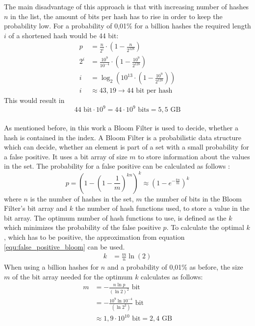 The main disadvantage of this approach is that with increasing number of hashes $n$ in the list, the amount of bits per hash has to rise in order to keep the probability low.
For a probability of 0,01\% for a billion hashes the required length $i$ of a shortened hash would be 44 bit:
\begin{equation}
	\begin{split}
		p&=\frac{n}{2^i}\cdot \left(1- \frac{n}{2^{128}}\right) \\[10pt]
		2^i&=\frac{10^9}{10^{-4}}\cdot \left(1- \frac{10^9}{2^{128}}\right) \\[10pt]
		i&=\log_2\left(10^{13}\cdot \left(1- \frac{10^9}{2^{128}}\right)\right) \\[10pt]
		i&\approx 43,19 \rightarrow 44 \text{ bit per hash}
	\end{split}
\end{equation}
This would result in 
\begin{equation}
	44\text{ bit} \cdot 10^9 = 44\cdot10^9 \text{ bits} = 5,5 \text{ GB}
\end{equation}
\\
As mentioned before, in this work a Bloom Filter is used to decide, whether a hash is contained in the index.
A Bloom Filter is a probabilistic data structure which can decide, whether an element is part of a set with a small probability for a false positive.
It uses a bit array of size $m$ to store information about the values in the set.
The probability for a false positive can be calculated as follows \cite{fan2000summary}:
\begin{equation}\label{equ:false_positive_bloom}
	p=\left(1-\left(1-\frac{1}{m}\right)^{kn}\right)^k \approx \left(1-e^{-\frac{kn}{m}}\right)^k
\end{equation}
where $n$ is the number of hashes in the set, $m$ the number of bits in the Bloom Filter's bit array and $k$ the number of hash functions used, to store a value in the bit array.
The optimum number of hash functions to use, is defined as the $k$ which minimizes the probability of the false positive $p$.
To calculate the optimal $k$, which has to be positive, the approximation from equation \ref{equ:false_positive_bloom} can be used.
\begin{equation}
	\begin{split}
		k&=\frac{m}{n}\ln(2)
	\end{split}
\end{equation}
When using a billion hashes for $n$ and a probability of 0,01\% as before, the size $m$ of the bit array needed for the optimum $k$ calculates as follows:
\begin{equation}
	\begin{split}
		m&=-\frac{n\ln p}{(\ln2)^2} \text{ bit} \\[10pt]
		&=-\frac{10^9\ln10^{-4}}{(\ln2^2)} \text{ bit} \\[10pt]
		&\approx 1,9\cdot10^{10} \text{ bit}=2,4\text{ GB}
	\end{split}
\end{equation}

